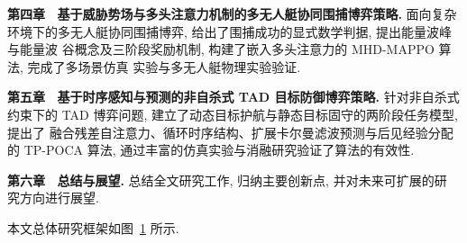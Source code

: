 \textbf{第四章 \ 基于威胁势场与多头注意力机制的多无人艇协同围捕博弈策略.} 面向复杂
环境下的多无人艇协同围捕博弈, 给出了围捕成功的显式数学判据, 提出能量波峰与能量波
谷概念及三阶段奖励机制, 构建了嵌入多头注意力的 MHD-MAPPO 算法, 完成了多场景仿真
实验与多无人艇物理实验验证.

\textbf{第五章 \ 基于时序感知与预测的非自杀式 TAD 目标防御博弈策略.} 针对非自杀式
约束下的 TAD 博弈问题, 建立了动态目标护航与静态目标固守的两阶段任务模型, 提出了
融合残差自注意力、循环时序结构、扩展卡尔曼滤波预测与后见经验分配的 TP-POCA 算法,
通过丰富的仿真实验与消融研究验证了算法的有效性.

\textbf{第六章 \ 总结与展望.} 总结全文研究工作, 归纳主要创新点, 并对未来可扩展的研
究方向进行展望.

本文总体研究框架如图~\ref{fig:thesis_framework} 所示.

\begin{figure}[!htbp]
  \centering
  \vspace{4cm}
  \label{fig:thesis_framework}
\end{figure}

